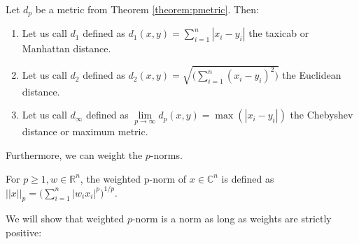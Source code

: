 	\begin{definition}
		Let $d_p$ be a metric from Theorem \ref{theorem:pmetric}.
		Then:
		\begin{enumerate}
			\item Let us call $d_1$ defined as $d_1(x,y) = \sum_{i=1}^{n}|x_i-y_i|$ the taxicab or Manhattan distance.
			\item Let us call $d_2$ defined as $d_2(x,y) = \sqrt{\big( \sum_{i=1}^{n}(x_i-y_i)^2 \big) }$ the Euclidean distance.
			\item Let us call $d_\infty$ defined as $\lim\limits_{p \rightarrow \infty}d_p(x,y) = \max(|x_i - y_i|)$ the Chebyshev distance or maximum metric.
		\end{enumerate}
	\end{definition}
	Furthermore, we can weight the $p$-norms.
	\begin{definition}
		For $p \ge 1, w \in \mathbb{R}^n$, the weighted p-norm of $x \in \mathbb{C}^n$ is defined as $||x||_p = \big( \sum_{i=1}^{n}|w_ix_i|^p \big)^{1/p}$. 
	\end{definition}
	We will show that weighted $p$-norm is a norm as long as weights are strictly positive:
